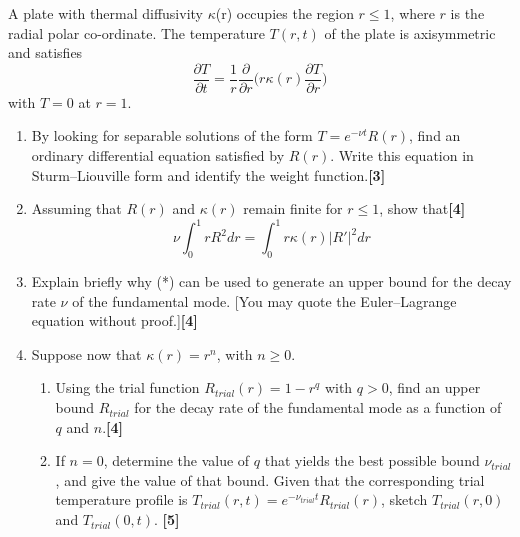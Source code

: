 \documentclass[a4paper]{article}
\begin{document}
\newpage
\begin{qns}
A plate with thermal diffusivity $\kappa$(r) occupies the region $r\leq 1$, where $r$ is the radial
polar co-ordinate. The temperature $T(r, t)$ of the plate is axisymmetric and satisfies
$$\frac{\partial T}{\partial t}=\frac{1}{r}\frac{\partial}{\partial r}\bigg(r\kappa(r)\frac{\partial T}{\partial r}\bigg)$$
with $T = 0$ at $r = 1$.
\begin{enumerate}[label=(\alph*)]
\item By looking for separable solutions of the form $T=e^{-\nu t}R(r)$, find an ordinary differential equation satisfied by $R(r)$. Write this equation in Sturm–Liouville form and identify the weight function.\hfill\textbf{[3]}
\item Assuming that $R(r)$ and $\kappa(r)$ remain finite for $r\leq 1$, show that\hfill\textbf{[4]}
\begin{equation}
    \nu\int_0^1rR^2dr=\int_0^1r\kappa(r)|R'|^2dr\tag{*}
\end{equation}
\item Explain briefly why (*) can be used to generate an upper bound for the decay rate $\nu$ of the fundamental mode. [You may quote the Euler–Lagrange equation without proof.]\hfill\textbf{[4]}
\item Suppose now that $\kappa(r) = r^n$, with $n\geq0$.
\begin{enumerate}[label=(\roman*)]
\item Using the trial function $R_{trial}(r) = 1 − r^q$ with $q > 0$, find an upper bound $R_{trial}$ for the decay rate of the fundamental mode as a function of $q$ and $n$.\hfill\textbf{[4]}
\item
If $n = 0$, determine the value of $q$ that yields the best possible bound $\nu_{trial}$, and give the value of that bound. Given that the corresponding trial temperature profile is $T_{trial}(r, t) = e^{−\nu_{trial}t}R_{trial}(r)$, sketch $T_{trial}(r, 0)$ and $T_{trial}(0, t)$. \hfill\textbf{[5]}
\end{enumerate}
\end{enumerate}
\end{qns}
\end{document}
